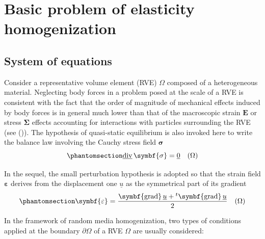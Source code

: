 \documentclass[
  a4paper,
  numbers=noendperiod,
  DIV=12]{scrreprt}
\newcommand{\uu}[1]{{\symbf{{#1}}}}
\newcommand{\uv}[1]{{\underline{{#1}}}}
\newcommand{\eps}{{\uu{{\varepsilon}}}}
\newcommand{\E}{{\uu{{E}}}}
\newcommand{\sig}{{\uu{{\sigma}}}}
\newcommand{\Sig}{{\uu{{\Sigma}}}}
\newcommand{\trans}[1]{{{}^{t}{#1}}}
\DeclareMathOperator{\divu}{\uv{div}}
\DeclareMathOperator{\graduu}{\uu{grad}}
\begin{document}
\chapter{Basic problem of elasticity
homogenization}\label{sec-basics_elas}

\section{System of equations}\label{sec-basics_elas_sys_eq}

Consider a representative volume element (RVE) \(\Omega\) composed of a
heterogeneous material. Neglecting body forces in a problem posed at the
scale of a RVE is consistent with the fact that the order of magnitude
of mechanical effects induced by body forces is in general much lower
than that of the macroscopic strain \(\E\) or stress \(\Sig\) effects
accounting for interactions with particles surrounding the RVE (see
()). The hypothesis of
quasi-static equilibrium is also invoked here to write the balance law
involving the Cauchy stress field \(\sig\)
\begin{equation}\phantomsection\label{eq-divsigma}{
\divu{\sig}=\uv{0} \quad(\Omega)
}\end{equation}

In the sequel, the small perturbation hypothesis is adopted so that the
strain field \(\eps\) derives from the displacement one \(\uv{u}\) as
the symmetrical part of its gradient
\begin{equation}\phantomsection\label{eq-epsgradu}{
\eps=\frac{\graduu{\uv{u}}+\trans{\graduu{\uv{u}}}}{2} \quad(\Omega)
}\end{equation}

In the framework of random media homogenization, two types of conditions
applied at the boundary \(\partial\Omega\) of a RVE \(\Omega\) are
usually considered:
\end{document}
